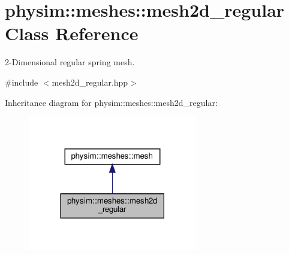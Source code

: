 \hypertarget{classphysim_1_1meshes_1_1mesh2d__regular}{}\section{physim\+:\+:meshes\+:\+:mesh2d\+\_\+regular Class Reference}
\label{classphysim_1_1meshes_1_1mesh2d__regular}


2-\/\+Dimensional regular spring mesh.  




{\ttfamily \#include $<$mesh2d\+\_\+regular.\+hpp$>$}



Inheritance diagram for physim\+:\+:meshes\+:\+:mesh2d\+\_\+regular\+:\nopagebreak
\begin{figure}[H]
\begin{center}
\leavevmode
\includegraphics[width=209pt]{classphysim_1_1meshes_1_1mesh2d__regular__inherit__graph}
\end{center}
\end{figure}


